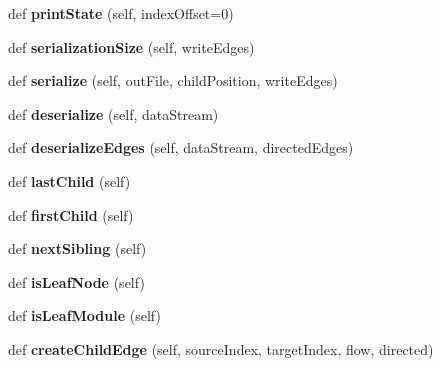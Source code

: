 \begin{DoxyCompactItemize}
\mbox{\label{classinfomapfolder_1_1infomap_1_1TreeIterator_add1200f753f1740db32f1551ba58d4be}} 
def {\bfseries print\+State} (self, index\+Offset=0)
\item 
\mbox{\label{classinfomapfolder_1_1infomap_1_1TreeIterator_a760e56c42b238b75be7116d2a4b364e0}} 
def {\bfseries serialization\+Size} (self, write\+Edges)
\item 
\mbox{\label{classinfomapfolder_1_1infomap_1_1TreeIterator_adab6f0cc406f63930b267402c6e3aaba}} 
def {\bfseries serialize} (self, out\+File, child\+Position, write\+Edges)
\item 
\mbox{\label{classinfomapfolder_1_1infomap_1_1TreeIterator_a64de7c6a4ebcc18ba82db358c16c75a4}} 
def {\bfseries deserialize} (self, data\+Stream)
\item 
\mbox{\label{classinfomapfolder_1_1infomap_1_1TreeIterator_aa35746805ff8186085d7e513805a8d6b}} 
def {\bfseries deserialize\+Edges} (self, data\+Stream, directed\+Edges)
\item 
\mbox{\label{classinfomapfolder_1_1infomap_1_1TreeIterator_a18b8c9378b72578869c827dd020a164f}} 
def {\bfseries last\+Child} (self)
\item 
\mbox{\label{classinfomapfolder_1_1infomap_1_1TreeIterator_a27021e73676fc046e8ce40ee62b820ec}} 
def {\bfseries first\+Child} (self)
\item 
\mbox{\label{classinfomapfolder_1_1infomap_1_1TreeIterator_aeb4df2afc11e260a1088c18c789e0a39}} 
def {\bfseries next\+Sibling} (self)
\item 
\mbox{\label{classinfomapfolder_1_1infomap_1_1TreeIterator_a08ab722b9ee4dc714dda837a3a04fba9}} 
def {\bfseries is\+Leaf\+Node} (self)
\item 
\mbox{\label{classinfomapfolder_1_1infomap_1_1TreeIterator_ac385bf33f88374de8c8a2d4ba969f71c}} 
def {\bfseries is\+Leaf\+Module} (self)
\item 
\mbox{\label{classinfomapfolder_1_1infomap_1_1TreeIterator_a2b1e25a8b3a1450f981e09fc1a91ef9a}} 
def {\bfseries create\+Child\+Edge} (self, source\+Index, target\+Index, flow, directed)
\end{DoxyCompactItemize}
